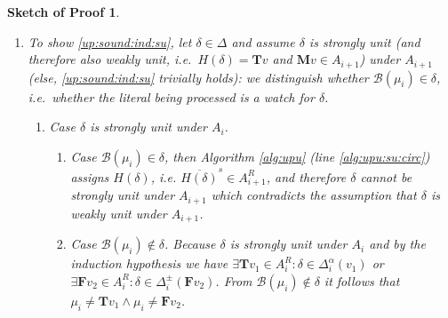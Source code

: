 \documentclass{vutinfth} %
\newtheorem{proof-sketch}{Sketch of Proof}[chapter]
\newcommand{\negstrong}[1]{\overline{#1}^s}
\newcommand{\bpro}{\mathcal{B}}
\newcommand{\ass}{A}
\newcommand{\bT}{\mathbf{T}}
\newcommand{\bM}{\mathbf{M}}
\newcommand{\bF}{\mathbf{F}}
\newcommand{\contradiction}{\Lightning}
\newcommand{\dpm}{\Delta^\pm}
\newcommand{\dal}{\Delta^\alpha}
\newcommand{\headf}{H}
\newcommand{\sgl}{\mu}
\begin{document}
\begin{proof-sketch}
\begin{enumerate}
\item To show \ref{up:sound:ind:su}, let $\delta \in \Delta$ and assume $\delta$ is strongly unit (and therefore also weakly unit, i.e.~$\headf(\delta) = \bT v$ and $\bM v \in \ass_{i+1}$) under $\ass_{i+1}$ (else, \ref{up:sound:ind:su} trivially holds): we distinguish whether $\bpro(\sgl_i) \in \delta$, i.e.~whether the literal being processed is a watch for $\delta$.
\begin{enumerate}
	\item Case $\delta$ is strongly unit under $\ass_i$.
	\begin{enumerate}
		\item Case $\bpro(\sgl_i) \in \delta$, then Algorithm \ref{alg:upu} (line \ref{alg:upu:su:circ}) assigns $\headf(\delta)$, i.e. $\negstrong{\headf(\delta)} \in \ass_{i+1}^R$, and therefore $\delta$ cannot be strongly unit under $\ass_{i+1}$ which contradicts the assumption that $\delta$ is weakly unit under $\ass_{i+1}$.
		\item Case $\bpro(\sgl_i) \not \in \delta$. Because $\delta$ is strongly unit under $\ass_i$ and by the induction hypothesis we have $\exists {\bT v_1} \in \ass_i^R : \delta \in \dal_i(v_1)$ or $\exists {\bF v_2} \in \ass_i^R : \delta \in \dpm_i({\bF v_2})$.
		From $\bpro(\sgl_i) \not \in \delta$ it follows that $\sgl_i \not = {\bT v_1} \wedge \sgl_i \not = {\bF v_2}$.	


\end{enumerate}
\end{enumerate}
\end{enumerate}
\end{proof-sketch}
\end{document}
